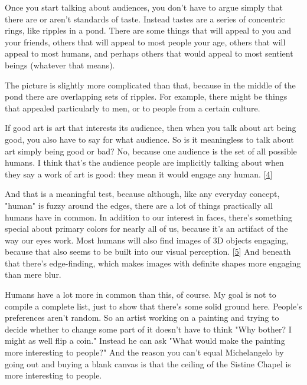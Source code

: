 Once you start talking about audiences, you don't
                  have to argue simply that there are or aren't standards of
                  taste. Instead tastes are a series of concentric rings, like
                  ripples in a pond. There are some things that will appeal to
                  you and your friends, others that will appeal to most people
                  your age, others that will appeal to most humans, and perhaps
                  others that would appeal to most sentient beings (whatever
                  that means).

The picture is slightly more
                  complicated than that, because in the middle of the pond there
                  are overlapping sets of ripples. For example, there might be
                  things that appealed particularly to men, or to people from a
                  certain culture.

If good art is art that interests
                  its audience, then when you talk about art being good, you
                  also have to say for what audience. So is it meaningless to
                  talk about art simply being good or bad? No, because one
                  audience is the set of all possible humans. I think that's the
                  audience people are implicitly talking about when they say a
                  work of art is good: they mean it would engage any human.
                  [\href{\#f4n}{4}]

And that is a meaningful test, because although,
                  like any everyday concept, "human" is fuzzy around the edges,
                  there are a lot of things practically all humans have in
                  common. In addition to our interest in faces, there's
                  something special about primary colors for nearly all of us,
                  because it's an artifact of the way our eyes work. Most humans
                  will also find images of 3D objects engaging, because that
                  also seems to be built into our visual perception.
                  [\href{\#f5n}{5}]
                  And beneath that there's edge-finding, which makes images with
                  definite shapes more engaging than mere blur.

Humans
                  have a lot more in common than this, of course. My goal is not
                  to compile a complete list, just to show that there's some
                  solid ground here. People's preferences aren't random. So an
                  artist working on a painting and trying to decide whether to
                  change some part of it doesn't have to think "Why bother? I
                  might as well flip a coin." Instead he can ask "What would
                  make the painting more interesting to people?" And the reason
                  you can't equal Michelangelo by going out and buying a blank
                  canvas is that the ceiling of the Sistine Chapel is more
                  interesting to people.

